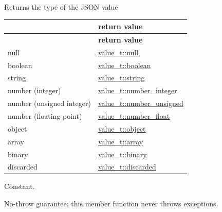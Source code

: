 \begin{DoxyReturn}{Returns}
the type of the J\+S\+ON value \tabulinesep=1mm
\begin{longtabu} spread 0pt [c]{*2{|X[-1]}|}
\hline
{}&{\bf return value  }\\
\endfirsthead
\hline
\endfoot
\hline
{}&{\bf return value  }\\
\endhead
null &\hyperlink{namespacenlohmann_1_1detail_a1ed8fc6239da25abcaf681d30ace4985a37a6259cc0c1dae299a7866489dff0bd}{value\+\_\+t\+::null} \\
boolean &\hyperlink{namespacenlohmann_1_1detail_a1ed8fc6239da25abcaf681d30ace4985a84e2c64f38f78ba3ea5c905ab5a2da27}{value\+\_\+t\+::boolean} \\
string &\hyperlink{namespacenlohmann_1_1detail_a1ed8fc6239da25abcaf681d30ace4985ab45cffe084dd3d20d928bee85e7b0f21}{value\+\_\+t\+::string} \\
number (integer) &\hyperlink{namespacenlohmann_1_1detail_a1ed8fc6239da25abcaf681d30ace4985a5763da164f8659d94a56e29df64b4bcc}{value\+\_\+t\+::number\+\_\+integer} \\
number (unsigned integer) &\hyperlink{namespacenlohmann_1_1detail_a1ed8fc6239da25abcaf681d30ace4985adce7cc8ec29055c4158828921f2f265e}{value\+\_\+t\+::number\+\_\+unsigned} \\
number (floating-\/point) &\hyperlink{namespacenlohmann_1_1detail_a1ed8fc6239da25abcaf681d30ace4985ad9966ecb59667235a57b4b999a649eef}{value\+\_\+t\+::number\+\_\+float} \\
object &\hyperlink{namespacenlohmann_1_1detail_a1ed8fc6239da25abcaf681d30ace4985aa8cfde6331bd59eb2ac96f8911c4b666}{value\+\_\+t\+::object} \\
array &\hyperlink{namespacenlohmann_1_1detail_a1ed8fc6239da25abcaf681d30ace4985af1f713c9e000f5d3f280adbd124df4f5}{value\+\_\+t\+::array} \\
binary &\hyperlink{namespacenlohmann_1_1detail_a1ed8fc6239da25abcaf681d30ace4985a9d7183f16acce70658f686ae7f1a4d20}{value\+\_\+t\+::binary} \\
discarded &\hyperlink{namespacenlohmann_1_1detail_a1ed8fc6239da25abcaf681d30ace4985a94708897ec9db8647dfe695714c98e46}{value\+\_\+t\+::discarded} \\
\end{longtabu}
Constant.
\end{DoxyReturn}
No-\/throw guarantee\+: this member function never throws exceptions.

